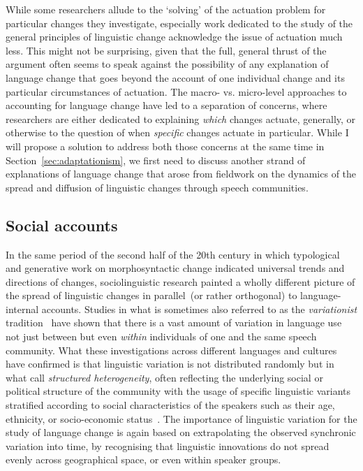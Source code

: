While some researchers allude to the `solving' of the actuation problem for particular changes they investigate\citep[e.g.][]{Baker2011,Stevens2013}, especially work dedicated to the study of the general principles of linguistic change acknowledge the issue of actuation much less. This might not be surprising, given that the full, general thrust of the argument often seems to speak against the possibility of any explanation of language change that goes beyond the account of one individual change and its particular circumstances of actuation.
The macro- vs. micro-level approaches to accounting for language change have led to a separation of concerns, where researchers are either dedicated to explaining \emph{which} changes actuate, generally, or otherwise to the question of when \emph{specific} changes actuate in particular. While I will propose a solution to address both those concerns at the same time in Section~\ref{sec:adaptationism}, we first need to discuss another strand of explanations of language change that arose from fieldwork on the dynamics of the spread and diffusion of linguistic changes through speech communities.

\subsection{Social accounts}
\label{sec:socialaccounts}

In the same period of the second half of the 20th century in which typological and generative work on morphosyntactic change indicated universal trends and directions of changes, sociolinguistic research %
painted a wholly different picture of the spread of linguistic changes in parallel~(or rather orthogonal) to language-internal accounts.
Studies in what is sometimes also referred to as the \emph{variationist} tradition~\citep{Tagliamonte2015} have shown that there is a vast amount of variation in language use not just between but even \emph{within} individuals of one and the same speech community.
What these investigations across different languages and cultures have confirmed is that linguistic variation is not distributed randomly but in what \citet{Weinreich1968} call \emph{structured heterogeneity}, often reflecting the underlying social or political structure of the community with the usage of specific linguistic variants stratified according to social characteristics of the speakers such as their age, ethnicity, or socio-economic status~\citep{Foulkes2006,Tagliamonte2012}.
The importance of linguistic variation for the study of language change is again based on extrapolating the observed synchronic variation into time, by recognising that linguistic innovations do not spread evenly across geographical space, or even within speaker groups.


